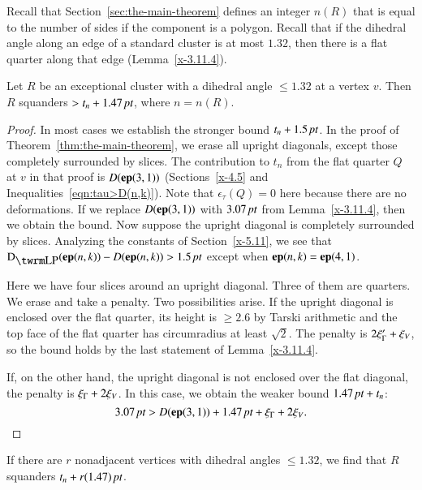 Recall that Section~\ref{sec:the-main-theorem} defines an integer $n(R)$
that is equal to the number of sides if the component is a polygon.  Recall
that if the dihedral angle along an edge of a standard cluster is at
most $1.32$, then there is a flat quarter along that edge
(Lemma~\ref{x-3.11.4}).



\begin{lemma}
Let $R$ be an exceptional cluster with a dihedral angle
$\le1.32$ at a vertex $v$. Then $R$ squanders $>t_n+1.47\,\hbox{\it pt}$, where
$n=n(R)$.
\end{lemma}

\begin{proof}
In most cases we establish the stronger bound $t_n+1.5\,\hbox{\it pt}$. In the
proof of Theorem~\ref{thm:the-main-theorem}, we erase all upright
diagonals, except those completely surrounded by slices. The
contribution to $t_n$ from the flat quarter $Q$ at $v$ in that proof is
$D({\operatorname{\bf ep}}{(3,1)})$ (Sections~\ref{x-4.5} and Inequalities~\ref{eqn:tau>D(n,k)}).
Note that $\epsilon_\tau(Q)=0$ here because there are no deformations.
If we replace $D({\operatorname{\bf ep}}{(3,1)})$ with $3.07\,\hbox{\it pt}$ from Lemma~\ref{x-3.11.4}, then
we obtain the bound. Now suppose the upright diagonal is completely
surrounded by slices. Analyzing the constants of
Section~\ref{x-5.11}, we see that $\DLP(\y{(n,k)})-D(\y{(n,k)})>1.5\,\pt$ except
when ${\operatorname{\bf ep}}{(n,k)}={\operatorname{\bf ep}}{(4,1)}$.

Here we have four slices around an upright diagonal. Three
of them are quarters.  We erase and take a penalty. Two possibilities
arise.  If the upright diagonal is enclosed over the flat quarter, its
height is $\ge2.6$ by Tarski arithmetic and the top face of the
flat quarter has circumradius at least $\sqrt2$.  The penalty is
$2\xi_\Gamma'+\xi_V$, so the bound holds by the last statement of
Lemma~\ref{x-3.11.4}.

If, on the other hand, the upright diagonal is not enclosed over the
flat diagonal, the penalty is $\xi_\Gamma+2\xi_V$.  In this case, we obtain the
weaker bound $1.47\,\hbox{\it pt}+t_n$:
    $$3.07\,\hbox{\it pt} > D({\operatorname{\bf ep}}{(3,1)}) + 1.47\,\hbox{\it pt} +\xi_\Gamma+2\xi_V.$$
\end{proof}

\begin{remark} \label{remark:1.47}
If there are $r$ nonadjacent vertices with dihedral angles
$\le1.32$, we find that $R$ squanders $t_n+r(1.47)\,\hbox{\it pt}$.
\end{remark}

